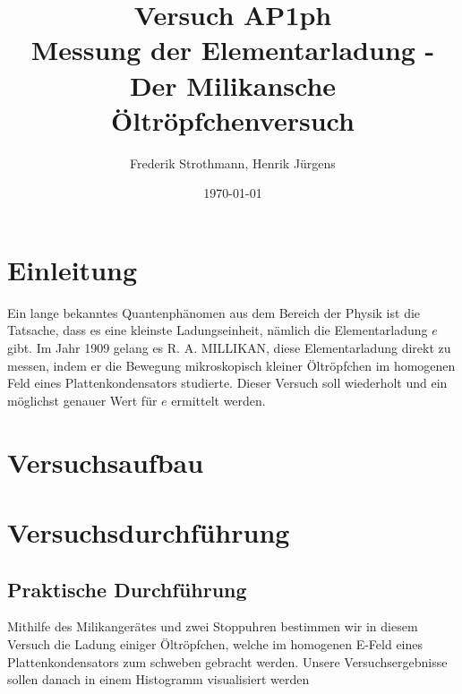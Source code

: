 \documentclass[12pt]{scrartcl}
\title{Versuch AP1ph\\ Messung der Elementarladung - Der Milikansche Öltröpfchenversuch}
\author{Frederik Strothmann, Henrik Jürgens}
\date{\today}
\begin{document}

\maketitle
\tableofcontents
\newpage


\section{Einleitung}

Ein lange bekanntes Quantenphänomen aus dem Bereich der Physik ist die Tatsache, dass es eine kleinste
Ladungseinheit, nämlich die Elementarladung $e$ gibt. Im Jahr 1909 gelang es R. A. MILLIKAN, diese Elementarladung direkt zu messen, indem er die Bewegung mikroskopisch kleiner Öltröpfchen im homogenen Feld eines Plattenkondensators studierte. Dieser Versuch soll wiederholt und ein möglichst genauer Wert für $e$ ermittelt werden.

\section{Versuchsaufbau}


\section{Versuchsdurchführung}


\subsection{Praktische Durchführung}
Mithilfe des Milikangerätes und zwei Stoppuhren bestimmen wir in diesem Versuch die Ladung einiger Öltröpfchen, welche im homogenen E-Feld eines Plattenkondensators zum schweben gebracht werden. Unsere Versuchsergebnisse sollen danach in einem Histogramm visualisiert werden
\end{document}
